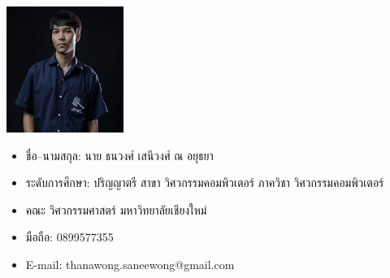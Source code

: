 \documentclass[final]{cpecmu}
\author{นายกฤษฏิ์ อุปนันท์}{Krit Upanun}{600610717}
\author{นายธนวงศ์ เสนีวงศ์ ณ อยุธยา}{Thanawong Saneewong Na Ayutthaya}{600610738}
\begin{document}


\pagestyle{empty}\cleardoublepage
\normalspacing \setcounter{page}{1}  \pagestyle{cpecmu}





\ifproject

\fi



\ifproject
\appendix


\ifglossary\glossarypage\fi

\ifindex\indexpage\fi

\begin{biosketch}
\begin{center}
  \includegraphics[width=1.5in]{./images/tom_pic_resize.png}
\end{center}
\begin{itemize}[label={},leftmargin=*,labelsep=0pt]
  \item ชื่อ--นามสกุล: นาย ธนวงศ์ เสนีวงศ์ ณ อยุธยา
  \item ระดับการศึกษา: ปริญญาตรี สาขา วิศวกรรมคอมพิวเตอร์ ภาควิชา วิศวกรรมคอมพิวเตอร์
  \item คณะ วิศวกรรมศาสตร์ มหาวิทยาลัยเชียงใหม่
  \item มือถือ: 0899577355 
  \item E-mail: thanawong.saneewong@gmail.com
\end{itemize}



\end{biosketch}
\end{document}

